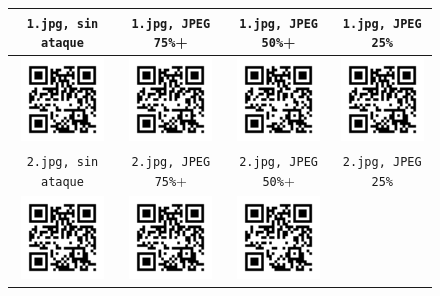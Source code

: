 \documentclass{rcci} %
\begin{document}
\begin{figure}[H]	%
\begin{center}
\begin{tabular}{|c|c|c|c|}\hline
\verb+1.jpg, sin ataque+
&\verb+1.jpg, JPEG 75%+
&\verb+1.jpg, JPEG 50%+
&\verb+1.jpg, JPEG 25%+\\\hline
\includegraphics[width=2.2cm]{1_without_noise}
&\includegraphics[width=2.2cm]{1_jpeg_75}
&\includegraphics[width=2.2cm]{1_jpeg_50}
&\includegraphics[width=2.2cm]{1_jpeg_25}\\\hline
\verb+2.jpg, sin ataque+
&\verb+2.jpg, JPEG 75%+
&\verb+2.jpg, JPEG 50%+
&\verb+2.jpg, JPEG 25%+\\\hline
\includegraphics[width=2.2cm]{2_without_noise}
&\includegraphics[width=2.2cm]{2_jpeg_75}
&\includegraphics[width=2.2cm]{2_jpeg_50}

\end{tabular}
\end{center}
\end{figure}
\end{document}
